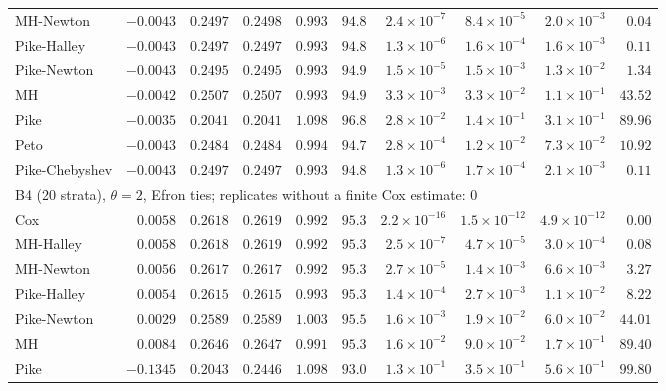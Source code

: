 \begin{landscape}
\begin{longtable}{lrrrrrrrrr}
MH-Newton & $-0.0043$ & $0.2497$ & $0.2498$ & $0.993$ & $94.8$ & $2.4 \times 10^{-7}$ & $8.4 \times 10^{-5}$ & $2.0 \times 10^{-3}$ & $0.04$ \\
Pike-Halley & $-0.0043$ & $0.2497$ & $0.2497$ & $0.993$ & $94.8$ & $1.3 \times 10^{-6}$ & $1.6 \times 10^{-4}$ & $1.6 \times 10^{-3}$ & $0.11$ \\
Pike-Newton & $-0.0043$ & $0.2495$ & $0.2495$ & $0.993$ & $94.9$ & $1.5 \times 10^{-5}$ & $1.5 \times 10^{-3}$ & $1.3 \times 10^{-2}$ & $1.34$ \\
MH & $-0.0042$ & $0.2507$ & $0.2507$ & $0.993$ & $94.9$ & $3.3 \times 10^{-3}$ & $3.3 \times 10^{-2}$ & $1.1 \times 10^{-1}$ & $43.52$ \\
Pike & $-0.0035$ & $0.2041$ & $0.2041$ & $1.098$ & $96.8$ & $2.8 \times 10^{-2}$ & $1.4 \times 10^{-1}$ & $3.1 \times 10^{-1}$ & $89.96$ \\
Peto & $-0.0043$ & $0.2484$ & $0.2484$ & $0.994$ & $94.7$ & $2.8 \times 10^{-4}$ & $1.2 \times 10^{-2}$ & $7.3 \times 10^{-2}$ & $10.92$ \\
Pike-Chebyshev & $-0.0043$ & $0.2497$ & $0.2497$ & $0.993$ & $94.8$ & $1.3 \times 10^{-6}$ & $1.7 \times 10^{-4}$ & $2.1 \times 10^{-3}$ & $0.11$ \\
\multicolumn{10}{l}{B4 (20 strata), $\theta = 2$, Efron ties; replicates without a finite Cox estimate: 0} \\
Cox & $0.0058$ & $0.2618$ & $0.2619$ & $0.992$ & $95.3$ & $2.2 \times 10^{-16}$ & $1.5 \times 10^{-12}$ & $4.9 \times 10^{-12}$ & $0.00$ \\
MH-Halley & $0.0058$ & $0.2618$ & $0.2619$ & $0.992$ & $95.3$ & $2.5 \times 10^{-7}$ & $4.7 \times 10^{-5}$ & $3.0 \times 10^{-4}$ & $0.08$ \\
MH-Newton & $0.0056$ & $0.2617$ & $0.2617$ & $0.992$ & $95.3$ & $2.7 \times 10^{-5}$ & $1.4 \times 10^{-3}$ & $6.6 \times 10^{-3}$ & $3.27$ \\
Pike-Halley & $0.0054$ & $0.2615$ & $0.2615$ & $0.993$ & $95.3$ & $1.4 \times 10^{-4}$ & $2.7 \times 10^{-3}$ & $1.1 \times 10^{-2}$ & $8.22$ \\
Pike-Newton & $0.0029$ & $0.2589$ & $0.2589$ & $1.003$ & $95.5$ & $1.6 \times 10^{-3}$ & $1.9 \times 10^{-2}$ & $6.0 \times 10^{-2}$ & $44.01$ \\
MH & $0.0084$ & $0.2646$ & $0.2647$ & $0.991$ & $95.3$ & $1.6 \times 10^{-2}$ & $9.0 \times 10^{-2}$ & $1.7 \times 10^{-1}$ & $89.40$ \\
Pike & $-0.1345$ & $0.2043$ & $0.2446$ & $1.098$ & $93.0$ & $1.3 \times 10^{-1}$ & $3.5 \times 10^{-1}$ & $5.6 \times 10^{-1}$ & $99.80$ \\

\end{longtable}
\end{landscape}
